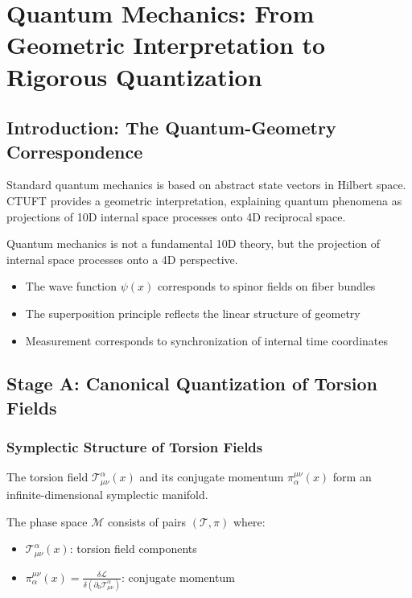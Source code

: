 \section{Quantum Mechanics: From Geometric Interpretation to Rigorous Quantization}
\label{sec:quantum}

\subsection{Introduction: The Quantum-Geometry Correspondence}

Standard quantum mechanics is based on abstract state vectors in Hilbert space. CTUFT provides a geometric interpretation, explaining quantum phenomena as projections of 10D internal space processes onto 4D reciprocal space.

\begin{insight}
Quantum mechanics is not a fundamental 10D theory, but the projection of internal space processes onto a 4D perspective.
\begin{itemize}
    \item The wave function $\psi(x)$ corresponds to spinor fields on fiber bundles
    \item The superposition principle reflects the linear structure of geometry
    \item Measurement corresponds to synchronization of internal time coordinates
\end{itemize}
\end{insight}

\subsection{Stage A: Canonical Quantization of Torsion Fields}
\label{subsec:stageA_canonical}

\subsubsection{Symplectic Structure of Torsion Fields}

The torsion field $\mathcal{T}^\alpha_{\mu\nu}(x)$ and its conjugate momentum $\pi_\alpha^{\mu\nu}(x)$ form an infinite-dimensional symplectic manifold.

\begin{definition}
The phase space $\mathcal{M}$ consists of pairs $(\mathcal{T}, \pi)$ where:
\begin{itemize}
    \item $\mathcal{T}^\alpha_{\mu\nu}(x)$: torsion field components
    \item $\pi_\alpha^{\mu\nu}(x) = \frac{\delta \mathcal{L}}{\delta(\partial_0 \mathcal{T}^\alpha_{\mu\nu})}$: conjugate momentum
\end{itemize}
\end{definition}


